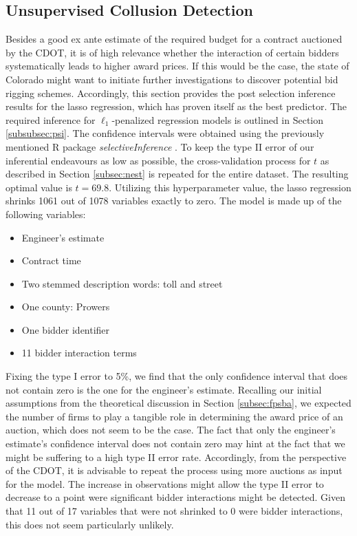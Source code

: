 \documentclass[a4paper,12pt, headsepline]{scrartcl}
\numberwithin{equation}{section}
\begin{document}
\subsection{Unsupervised Collusion Detection}\label{subsec:col}
Besides a good ex ante estimate of the required budget for a contract auctioned by the CDOT, it is of high relevance whether the interaction of certain bidders systematically leads to higher award prices. If this would be the case, the state of Colorado might want to initiate further investigations to discover potential bid rigging schemes. Accordingly, this section provides the post selection inference results for the lasso regression, which has proven itself as the best predictor. The required inference for $\ell_1$-penalized regression models is outlined in Section \ref{subsubsec:psi}. The confidence intervals were obtained using the previously mentioned R package \textit{selectiveInference} \citep{selectiveInference}. To keep the type II error of our inferential endeavours as low as possible, the cross-validation process for $t$ as described in Section \ref{subsec:nest} is repeated for the entire dataset. The resulting optimal value is $t = 69.8$. Utilizing this hyperparameter value, the lasso regression shrinks 1061 out of 1078 variables exactly to zero. The model is made up of the following variables:
\begin{itemize}
	\item Engineer's estimate
	\item Contract time
	\item Two stemmed description words: toll and street
	\item One county: Prowers
	\item One bidder identifier
	\item 11 bidder interaction terms 
\end{itemize}
Fixing the type I error to 5\%, we find that the only confidence interval that does not contain zero is the one for the engineer's estimate. Recalling our initial assumptions from the theoretical discussion in Section \ref{subsec:fpsba}, we expected the number of firms to play a tangible role in determining the award price of an auction, which does not seem to be the case. The fact that only the engineer's estimate's confidence interval does not contain zero may hint at the fact that we might be suffering to a high type II error rate. Accordingly, from the perspective of the CDOT, it is advisable to repeat the process using more auctions as input for the model. The increase in observations might allow the type II error to decrease to a point were significant bidder interactions might be detected. Given that 11 out of 17 variables that were not shrinked to 0 were bidder interactions, this does not seem particularly unlikely.
\end{document}
